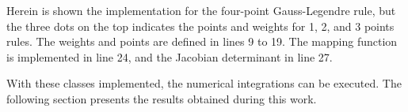 Herein is shown the implementation for the four-point Gauss-Legendre rule, but the three dots on the top indicates the points and weights for 1, 2, and 3 points rules. The weights and points are defined in lines 9 to 19. The mapping function is implemented in line 24, and the Jacobian determinant in line 27.

With these classes implemented, the numerical integrations can be executed. The following section presents the results obtained during this work.  